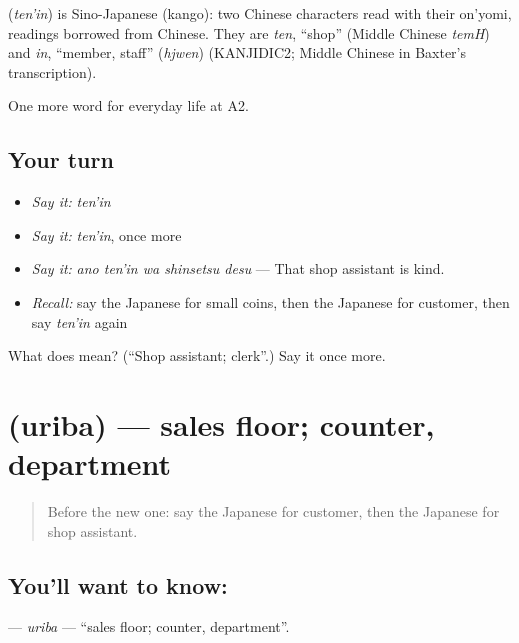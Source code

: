 \begin{cousinweb}
\textbf{} (\emph{ten'in}) is Sino-Japanese (kango): two Chinese characters read with their on'yomi, readings borrowed from Chinese. They are \emph{ten}, \textquotedblleft{}shop\textquotedblright{} (Middle Chinese \emph{temH}) and \emph{in}, \textquotedblleft{}member, staff\textquotedblright{} (\emph{hjwen}) (KANJIDIC2; Middle Chinese in Baxter's transcription).
\end{cousinweb}

\begin{grammarlens}[title={What you've built}]
One more word for everyday life at A2.
\end{grammarlens}

\subsection*{Your turn}
\begin{itemize}
\raggedright
  \item \emph{Say it:} \emph{ten'in}
  \item \emph{Say it:} \emph{ten'in}, once more
  \item \emph{Say it:} \emph{ano ten'in wa shinsetsu desu} — That shop assistant is kind.
  \item \emph{Recall:} say the Japanese for small coins, then the Japanese for customer, then say \emph{ten'in} again
\end{itemize}

\begin{tcolorbox}[breakable,colback=teal!4,colframe=teal!35!black,title={Before you move on}]
What does  mean? (\textquotedblleft{}Shop assistant; clerk\textquotedblright{}.) Say it once more.
\end{tcolorbox}
\section[\texorpdfstring{\ja{うりば} (uriba)}{うりば (uriba)}]{ (uriba) — sales floor; counter, department}

\label{lesson:JA-C183-uriba}



\begin{quote}
Before the new one: say the Japanese for customer, then the Japanese for shop assistant.
\end{quote}

\subsection*{You'll want to know: }
\textbf{} — \emph{uriba} — \textquotedblleft{}sales floor; counter, department\textquotedblright{}.

